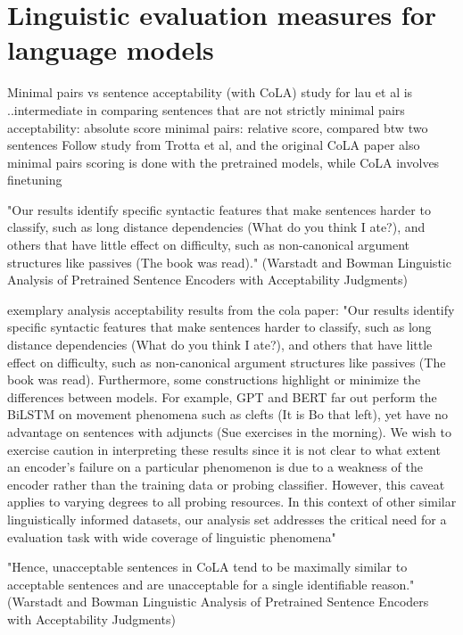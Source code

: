 \section{Linguistic evaluation measures for language models}



Minimal pairs vs sentence acceptability (with CoLA)
study for lau et al is ..intermediate in comparing sentences that are not strictly minimal pairs
acceptability: absolute score
minimal pairs: relative score, compared btw two sentences
Follow study from Trotta et al, and the original CoLA paper 
also minimal pairs scoring is done with the pretrained models, while CoLA involves finetuning

"Our results identify specific syntactic features that make sentences harder to classify, such as long distance dependencies (What do you think I
ate?), and others that have little effect on difficulty, such as non-canonical argument structures like passives (The book was read)." (Warstadt and Bowman Linguistic Analysis of Pretrained Sentence Encoders with Acceptability Judgments)

exemplary analysis acceptability results from the cola paper:
"Our results identify specific syntactic features
that make sentences harder to classify, such as
long distance dependencies (What do you think I
ate?), and others that have little effect on difficulty, such as non-canonical argument structures
like passives (The book was read). Furthermore,
some constructions highlight or minimize the differences between models. For example, GPT and
BERT far out perform the BiLSTM on movement
phenomena such as clefts (It is Bo that left), yet
have no advantage on sentences with adjuncts (Sue exercises in the morning). We wish to exercise caution in interpreting these results since it is not
clear to what extent an encoder’s failure on a particular phenomenon is due to a weakness of the encoder rather than the training data or probing
classifier. However, this caveat applies to varying
degrees to all probing resources. In this context of
other similar linguistically informed datasets, our analysis set addresses the critical need for a evaluation task with wide coverage of linguistic phenomena"

"Hence, unacceptable sentences in CoLA tend to
be maximally similar to acceptable sentences and
are unacceptable for a single identifiable reason."   (Warstadt and Bowman Linguistic Analysis of Pretrained Sentence Encoders with Acceptability Judgments)

